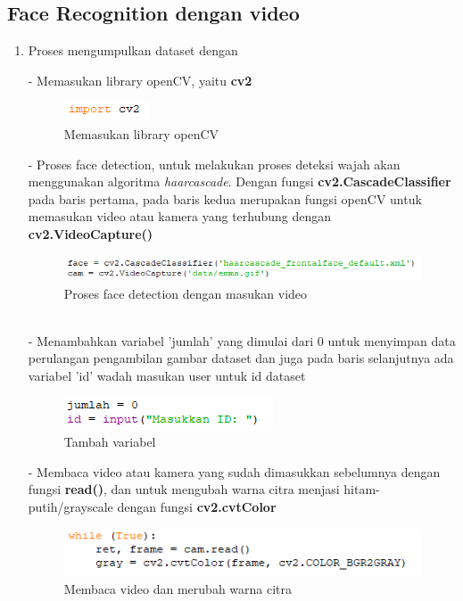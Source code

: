 
\subsection{Face Recognition dengan video}
\begin{enumerate}[1.]
\item Proses mengumpulkan dataset dengan

- Memasukan library openCV, yaitu \textbf{cv2}
\begin{figure}[h!]
    \centering
    \includegraphics[width=0.3\linewidth]{images/fr_1.PNG}
    \caption{Memasukan library openCV}
\end{figure}

-  Proses face detection, untuk melakukan proses deteksi wajah akan menggunakan algoritma \emph{haarcascade}. Dengan fungsi \textbf{cv2.CascadeClassifier} pada baris pertama, 
pada baris kedua merupakan fungsi openCV untuk memasukan video atau kamera yang terhubung dengan \textbf{cv2.VideoCapture()}
\begin{figure}[h!]
    \centering
    \includegraphics[width=0.85\linewidth]{images/fr_2.PNG}
    \caption{Proses face detection dengan masukan video}
\end{figure}\\

- Menambahkan variabel 'jumlah' yang dimulai dari 0 untuk menyimpan data perulangan pengambilan gambar dataset
dan juga pada baris selanjutnya ada variabel 'id' wadah masukan user untuk id dataset
\begin{figure}[h!]
    \centering
    \includegraphics[width=0.45\linewidth]{images/fr_3.PNG}
    \caption{Tambah variabel}
\end{figure}
\newpage
- Membaca video atau kamera yang sudah dimasukkan sebelumnya dengan fungsi \textbf{read()}, dan untuk mengubah warna citra menjasi hitam-putih/grayscale
dengan fungsi \textbf{cv2.cvtColor}
\begin{figure}[h!]
    \centering
    \includegraphics[width=0.85\linewidth]{images/fr_4.PNG}
    \caption{Membaca video dan merubah warna citra}
\end{figure}


\end{enumerate}
